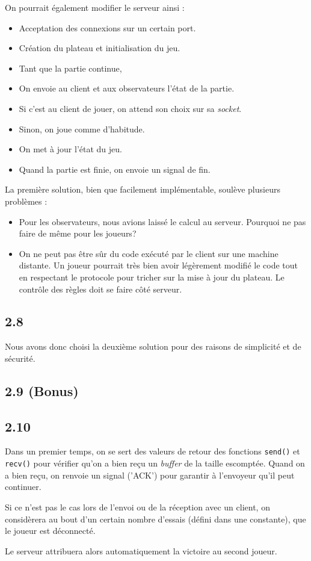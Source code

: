 \documentclass[12pt]{article}
\def\question#1{\subsection{#1}}
\begin{document}
On pourrait également modifier le serveur ainsi :
\begin{itemize}
  \item Acceptation des connexions sur un certain port.
  \item Création du plateau et initialisation du jeu.
  \item Tant que la partie continue,
  \item On envoie au client et aux observateurs l'état de la partie.
  \item Si c'est au client de jouer, on attend son choix sur sa \textit{socket}.
  \item Sinon, on joue comme d'habitude.
  \item On met à jour l'état du jeu.
  \item Quand la partie est finie, on envoie un signal de fin.
\end{itemize}


La première solution, bien que facilement implémentable, soulève plusieurs problèmes :
\begin{itemize}
\item Pour les observateurs, nous avions laissé le calcul au serveur. Pourquoi ne pas faire de même pour les joueurs?
\item On ne peut pas être sûr du code exécuté par le client sur une machine distante. Un joueur pourrait très bien avoir légèrement modifié le code tout en respectant le protocole pour tricher sur la mise à jour du plateau. Le contrôle des règles doit se faire côté serveur.
\end{itemize}



\question{2.8}
Nous avons donc choisi la deuxième solution pour des raisons de simplicité et de sécurité.

\question{2.9 (Bonus)}

\question{2.10}
Dans un premier temps, on se sert des valeurs de retour des fonctions \texttt{send()} et \texttt{recv()} pour vérifier qu'on a bien reçu un \textit{buffer} de la taille escomptée.
Quand on a bien reçu, on renvoie un signal ('ACK') pour garantir à l'envoyeur qu'il peut continuer.

Si ce n'est pas le cas lors de l'envoi ou de la réception avec un client, on considèrera au bout d'un certain nombre d'essais (défini dans une constante), que le joueur est déconnecté.

Le serveur attribuera alors automatiquement la victoire au second joueur. %
\end{document}
